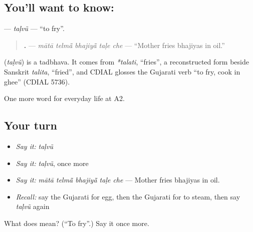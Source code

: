 \subsection*{You'll want to know: }
\textbf{} — \emph{taḷvũ} — \textquotedblleft{}to fry\textquotedblright{}.

\begin{quote}
\textbf{    .} — \emph{mātā telmā̃ bhajiyā̃ taḷe che} — \textquotedblleft{}Mother fries bhajiyas in oil.\textquotedblright{}
\end{quote}

\begin{cousinweb}
\textbf{} (\emph{taḷvũ}) is a tadbhava. It comes from \emph{*talati}, \textquotedblleft{}fries\textquotedblright{}, a reconstructed form beside Sanskrit \emph{talita}, \textquotedblleft{}fried\textquotedblright{}, and CDIAL glosses the Gujarati verb \textquotedblleft{}to fry, cook in ghee\textquotedblright{} (CDIAL 5736).
\end{cousinweb}

\begin{grammarlens}[title={What you've built}]
One more word for everyday life at A2.
\end{grammarlens}

\subsection*{Your turn}
\begin{itemize}
\raggedright
  \item \emph{Say it:} \emph{taḷvũ}
  \item \emph{Say it:} \emph{taḷvũ}, once more
  \item \emph{Say it:} \emph{mātā telmā̃ bhajiyā̃ taḷe che} — Mother fries bhajiyas in oil.
  \item \emph{Recall:} say the Gujarati for egg, then the Gujarati for to steam, then say \emph{taḷvũ} again
\end{itemize}

\begin{tcolorbox}[breakable,colback=teal!4,colframe=teal!35!black,title={Before you move on}]
What does  mean? (\textquotedblleft{}To fry\textquotedblright{}.) Say it once more.
\end{tcolorbox}
